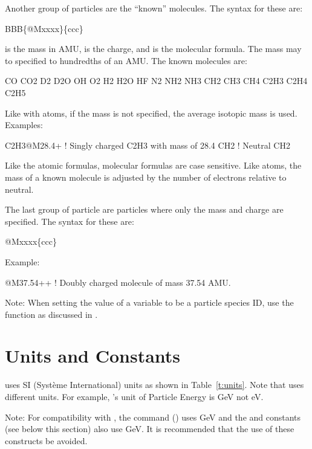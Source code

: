 {{{{{Another group of particles are the ``known'' molecules. The syntax for these are:
\begin{example}
  BBB\{@Mxxxx\}\{ccc\}
\end{example}
 is the mass in AMU,  is the charge, and  is the molecular formula. The
mass may to specified to hundredths of an AMU. The known molecules are:
\begin{example}
  CO       CO2      
  D2       D2O      
  OH       O2      
  H2       H2O      HF
  N2       NH2      NH3      
  CH2      CH3      CH4      
  C2H3     C2H4     C2H5
\end{example}
Like with atoms, if the mass is not specified, the average isotopic mass is used. Examples:
\begin{example}
  C2H3@M28.4+     ! Singly charged C2H3 with mass of 28.4
  CH2             ! Neutral CH2
\end{example}
Like the atomic formulas, molecular formulas are case sensitive. Like atoms, the mass of a known molecule
is adjusted by the number of electrons relative to neutral.

The last group of particle are particles where only the mass and charge are specified.  The syntax
for these are:
\begin{example}
  @Mxxxx\{ccc\}
\end{example}
Example:
\begin{example}
  @M37.54++    ! Doubly charged molecule of mass 37.54 AMU.
\end{example}

Note: When setting the value of a variable to be a particle species ID, use the  function as discussed
in .

\newpage

\section{Units and Constants}
\label{s:constants}

\bmad uses SI (Syst\`eme International) units as shown in Table~\ref{t:units}.  Note that \mad uses
different units. For example, \mad's unit of Particle Energy is GeV not eV. 

Note: For compatibility with \mad, the  command () uses GeV
and the  and  constants (see below this section) also use GeV. It is recommended that
the use of these constructs be avoided.

}}}}}

